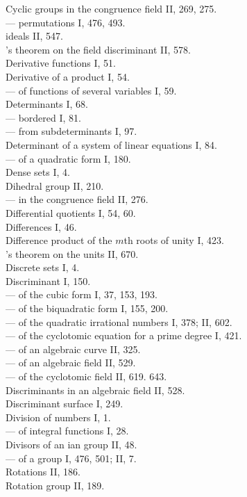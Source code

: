 \noindent
Cyclic groups in the congruence field II, 269, 275.\\
--- permutations I, 476, 493.\\

\medskip
\noindent
{} ideals II, 547.\\
's theorem on the field discriminant II, 578.\\
Derivative functions I, 51.\\
Derivative of a product I, 54.\\
--- of functions of several variables I, 59.\\
Determinants I, 68.\\
--- bordered I, 81.\\
--- from subdeterminants I, 97.\\
Determinant of a system of linear equations I, 84.\\
--- of a quadratic form I, 180.\\
Dense sets I, 4.\\
Dihedral group II, 210.\\
--- in the congruence field II, 276.\\
Differential quotients I, 54, 60.\\
Differences I, 46.\\
Difference product of the $m$th roots of unity I, 423.\\
's theorem on the units II, 670.\\
Discrete sets I, 4.\\
Discriminant I, 150.\\
--- of the cubic form I, 37, 153, 193.\\
--- of the biquadratic form I, 155, 200.\\
--- of the quadratic irrational numbers I, 378; II, 602.\\
--- of the cyclotomic equation for a prime degree I, 421.\\
--- of an algebraic curve II, 325.\\
--- of an algebraic field II, 529.\\
--- of the cyclotomic field II, 619. 643.\\ %
Discriminants in an algebraic field II, 528.\\
Discriminant surface I, 249.\\
Division of numbers I, 1.\\
--- of integral functions I, 28.\\
Divisors of an ian group II, 48.\\
--- of a group I, 476, 501; II, 7.\\
Rotations II, 186.\\
Rotation group II, 189.\\

